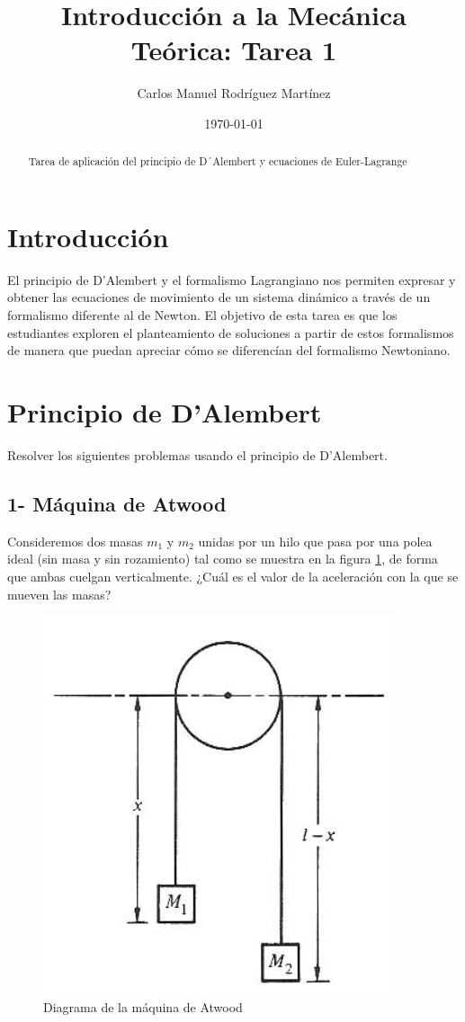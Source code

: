 \documentclass[letterpaper,12pt]{article}
\begin{document}
\title{Introducción a la Mecánica Teórica: Tarea 1}
\author{Carlos Manuel Rodríguez Martínez}
\date{\today}
\maketitle

\begin{abstract}
Tarea de aplicación del principio de D´Alembert y ecuaciones de Euler-Lagrange
\end{abstract}


\section{Introducción}

El principio de D'Alembert y el formalismo Lagrangiano nos permiten expresar y obtener las ecuaciones de movimiento de un sistema dinámico a través de un formalismo diferente al de Newton. El objetivo de esta tarea es que los estudiantes exploren el planteamiento de soluciones a partir de estos formalismos de manera que puedan apreciar cómo se diferencían del formalismo Newtoniano.


\section{Principio de D'Alembert}
Resolver los siguientes problemas usando el principio de D'Alembert.

\subsection{1- Máquina de Atwood}
Consideremos dos masas $m_1$ y $m_2$ unidas por un hilo que pasa por una polea ideal (sin masa y sin rozamiento) tal como se muestra en la figura \ref{fig:atwood}, de forma que ambas cuelgan verticalmente. ¿Cuál es el valor de la aceleración con la que se mueven las masas?

\begin{figure}[h!]
    \centering
    \includegraphics[width=.2\textwidth]{Atwood.png}
    \caption{Diagrama de la máquina de Atwood}
    \label{fig:atwood}
\end{figure}
\end{document}
